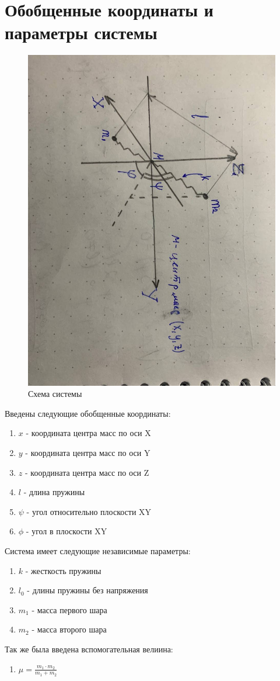 \documentclass[a4paper, 12pt]{article}
\begin{document}
\section{Обобщенные координаты и параметры системы}
\begin{figure}[H]
    \centering
    \includegraphics[angle=90, width = 120mm]{pictures/scheme.jpg}
    \caption{Схема системы}
\end{figure}
Введены следующие обобщенные координаты:
\begin{enumerate}
    \item $x$ - координата центра масс по оси X
    \item $y$ - координата центра масс по оси Y
    \item $z$ - координата центра масс по оси Z
    \item $l$ - длина пружины
    \item $\psi$ - угол относительно плоскости XY
    \item $\phi$ - угол в плоскости XY
\end{enumerate}
\newpage
Система имеет следующие независимые параметры:
\begin{enumerate}
    \item $k$ - жесткость пружины
    \item $l_0$ - длины пружины без напряжения
    \item $m_1$ - масса первого шара
    \item $m_2$ - масса второго шара
\end{enumerate}
Так же была введена вспомогательная велиина:
\begin{enumerate}
    \item $\mu = \frac{m_1\cdot m_2}{m_1+m_2}$
    \end{enumerate}
\end{document}
